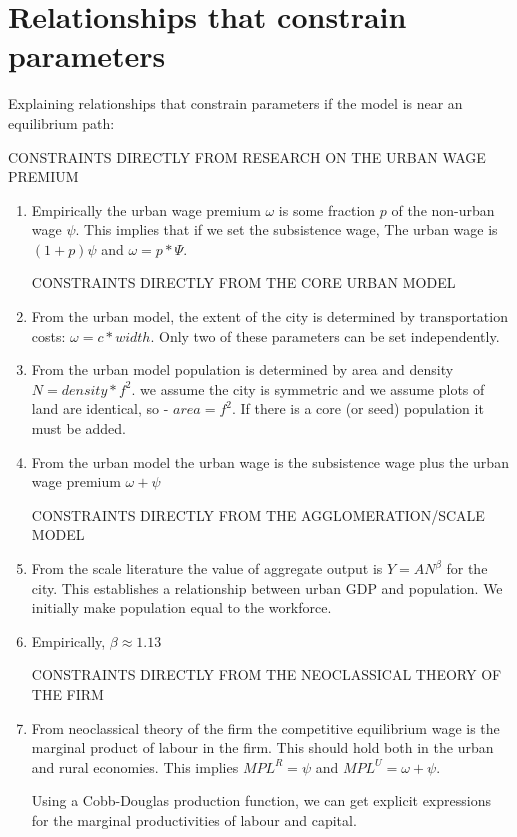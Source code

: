 \section{Relationships that constrain parameters }

Explaining relationships that constrain parameters if the model is near an equilibrium path: 

CONSTRAINTS DIRECTLY FROM RESEARCH ON THE URBAN WAGE PREMIUM
\begin{enumerate}
     \item  Empirically the urban wage premium  $\omega$ is some fraction $p$ of the non-urban wage $\psi$.   This implies that if we set the subsistence wage, The urban wage is $(1+p)\psi$ and $\omega= p*\Psi$.


CONSTRAINTS DIRECTLY FROM THE CORE URBAN MODEL
    \item From the urban model, the extent of the city is determined by transportation costs:   $\omega =c*width$.  Only two of these parameters can be set independently.

    \item From the urban model population is determined by area and density   $N=density* f^2$. we assume the city is symmetric  and we assume plots  of land are identical, so  - $area=f^2$. If there is a core (or seed) population it must be added.  
   
    \item From the urban model the urban wage is the subsistence wage plus the urban wage premium $\omega+\psi$ 

CONSTRAINTS DIRECTLY FROM THE AGGLOMERATION/SCALE MODEL
    \item From the scale literature the value of aggregate output is $Y=AN^\beta$ for the city. This establishes a relationship between urban GDP and population. We initially make population equal to the workforce. 

    \item Empirically, $\beta \approx 1.13$


CONSTRAINTS DIRECTLY FROM THE NEOCLASSICAL THEORY OF THE FIRM
    \item From neoclassical theory of the firm the competitive equilibrium wage is the  marginal product of labour in the firm.      This should hold both in the urban and rural economies. This implies       $ MPL^R=\psi$  and $ MPL^U=\omega+\psi $.

    Using a Cobb-Douglas production function, we can get explicit expressions for the marginal productivities of labour and capital. 


\end{enumerate}
